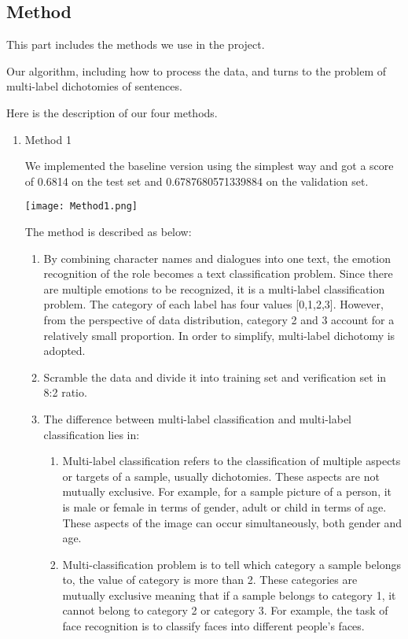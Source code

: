 \documentclass[12pt,twocolumn,letterpaper]{article}
\begin{document}
\subsection{Method}

This part includes the methods we use in the project. 

Our algorithm, including how to process the data, and turns to the problem of multi-label dichotomies of sentences.

Here is the description of our four methods.

\begin{enumerate}
\item Method 1

We implemented the baseline version using the simplest way and got a score of 0.6814 on the test set and 0.6787680571339884 on the validation set.

\texttt{[image: Method1.png]}

The method is described as below: 
\begin{enumerate}
\item By combining character names and dialogues into one text, the emotion recognition of the role becomes a text classification problem. Since there are multiple emotions to be recognized, it is a multi-label classification problem. The category of each label has four values [0,1,2,3]. However, from the perspective of data distribution, category 2 and 3 account for a relatively small proportion. In order to simplify, multi-label dichotomy is adopted. 
\item Scramble the data and divide it into training set and verification set in 8:2 ratio.  
\item The difference between multi-label classification and multi-label classification lies in:  

\begin{enumerate}
\item Multi-label classification refers to the classification of multiple aspects or targets of a sample, usually dichotomies. These aspects are not mutually exclusive. For example, for a sample picture of a person, it is male or female in terms of gender, adult or child in terms of age. These aspects of the image can occur simultaneously, both gender and age.  
\item Multi-classification problem is to tell which category a sample belongs to, the value of category is more than 2. These categories are mutually exclusive meaning that if a sample belongs to category 1, it cannot belong to category 2 or category 3. For example, the task of face recognition is to classify faces into different people's faces.  
\end{enumerate}


\end{enumerate}
\end{enumerate}
\end{document}
